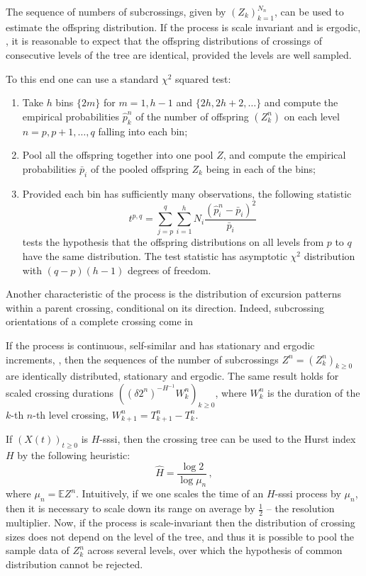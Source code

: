 \documentclass[a4paper]{article}
\newcommand{\ex}{\mathbb{E}}
\begin{document}
The sequence of numbers of subcrossings, given by $(Z_k)_{k=1}^{N_n}$, can be used to
estimate the offspring distribution.
If the process is scale invariant and is ergodic, \cite{ECP1673}, it is reasonable to
expect that the offspring distributions of crossings of consecutive
levels of the tree are identical, provided the levels are well sampled.

To this end one
can use a standard $\chi^2$ squared test:
\begin{enumerate}
    \item Take $h$ bins $\{2m\}$ for $m = 1,h-1$ and $\{2h, 2h+2,\ldots\}$ and compute
    the empirical probabilities $\hat{p}_k^n$ of the number of offspring $(Z_k^n)$ on
    each level $n=p, p+1, \ldots, q$ falling into each bin;
    \item Pool all the offspring together into one pool $Z$, and compute the empirical
    probabilities $\bar{p}_i$ of the pooled offspring $Z_k$ being in each of the bins;
    \item Provided each bin has sufficiently many observations, the following statistic
    \[ t^{p,q} = \sum_{j=p}^q \sum_{i=1}^h N_i \frac{(\hat{p}_i^n-\bar{p}_i)^2}{\bar{p}_i} \]
    tests the hypothesis that the offspring distributions on all levels from $p$ to $q$
    have the same distribution. The test statistic has asymptotic $\chi^2$ distribution
    with $(q-p)(h-1)$ degrees of freedom.
\end{enumerate}

Another characteristic of the process is the distribution of excursion patterns within
a parent crossing, conditional on its direction. Indeed, subcrossing orientations
of a complete crossing come in

If the process is continuous, self-similar and has stationary and ergodic increments,
\cite{jonesshen2005}, then the sequences of the number of subcrossings $Z^n = (Z_k^n)_{k\geq 0}$
are identically distributed, stationary and ergodic. The same result holds for
scaled crossing durations $((\delta 2^n)^{-H^{-1}} W_k^n)_{k\geq0}$, where $W_k^n$
is the duration of the $k$-th $n$-th level crossing, $W_{k+1}^n = T_{k+1}^n - T_k^n$.

If $(X(t))_{t\geq 0}$ is $H$-sssi, then the crossing tree can be used to the Hurst
index $H$ by the following heuristic:
\begin{equation*}
    \hat{H} = \frac{\log 2}{\log \mu_n} \,,
\end{equation*}
where $\mu_n = \ex Z^n$. Intuitively, if we one scales the time of an $H$-sssi
process by $\mu_n$, then it is necessary to scale down its range on average
by $\frac{1}{2}$ -- the resolution multiplier. Now, if the process is scale-invariant
then the distribution of crossing sizes does not depend on the level of the tree,
and thus it is possible to pool the sample data of $Z^n_k$ across several levels,
over which the hypothesis of common distribution cannot be rejected.
\end{document}
